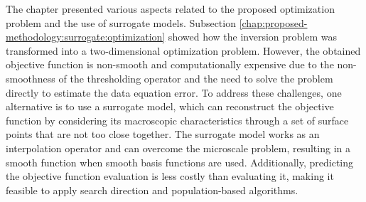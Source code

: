			
			The chapter presented various aspects related to the proposed optimization problem and the use of surrogate models. Subsection \ref{chap:proposed-methodology:surrogate:optimization} showed how the inversion problem was transformed into a two-dimensional optimization problem. However, the obtained objective function is non-smooth and computationally expensive due to the non-smoothness of the thresholding operator and the need to solve the problem directly to estimate the data equation error. To address these challenges, one alternative is to use a surrogate model, which can reconstruct the objective function by considering its macroscopic characteristics through a set of surface points that are not too close together. The surrogate model works as an interpolation operator and can overcome the microscale problem, resulting in a smooth function when smooth basis functions are used. Additionally, predicting the objective function evaluation is less costly than evaluating it, making it feasible to apply search direction and population-based algorithms.
			
